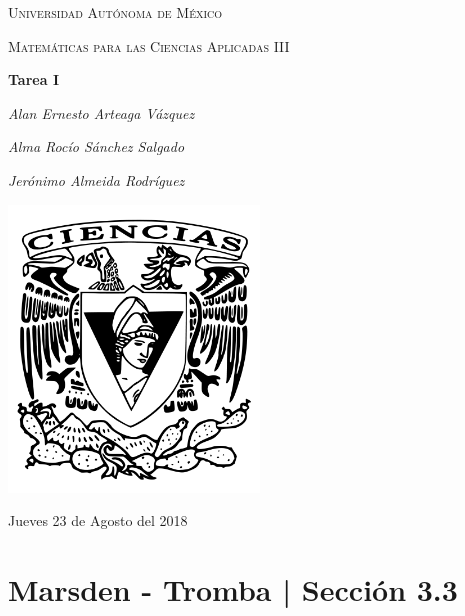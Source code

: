 \documentclass[a4paper,12pt]{article}
\begin{document}
\newcommand{\osf}[2]{\dfrac{#1^2}{#2^2}}
\newcommand{\T}{\Big(2\pi\cdot\sqrt{\dfrac{l}{g}}\Big)}
\newcommand{\alpa}{\dfrac{e^{x \beta -3}{2y\beta +5}}}
\newcommand{\deriv}[2]{\dfrac{\delta #1}{\delta #2}}
\newcommand{\sderiv}[3]{\dfrac{\delta ^2 #1}{\delta #2 \delta #3}}
\newcommand{\ext}{e^{ax-bt}}
\newcommand{\exy}{e^{((x-1)^2 + (y-3)^2}}
\newcommand{\xo}{\vec{x_0}} %

\begin{titlepage}
	\centering
	{\scshape\LARGE Universidad Autónoma de México \par}
	\vspace{1cm}
	{\scshape\Large Matemáticas para las Ciencias Aplicadas III\par}
	\vspace{1.5cm}
	{\huge\bfseries Tarea I\par}
	\vspace{.5cm}
	{\Large\itshape Alan Ernesto Arteaga Vázquez \par}
    \vspace{.5cm}
	{\Large\itshape Alma Rocío Sánchez Salgado \par}
    \vspace{.5cm}
	{\Large\itshape Jerónimo Almeida Rodríguez \par}
	\vfill
	 \includegraphics[width=0.5\textwidth]{../escudo_f-ciencias.png}
	\vfill

	{\large Jueves 23 de Agosto del 2018 \par}
\end{titlepage}

\newpage

\section{Marsden - Tromba | Sección 3.3}
\end{document}
